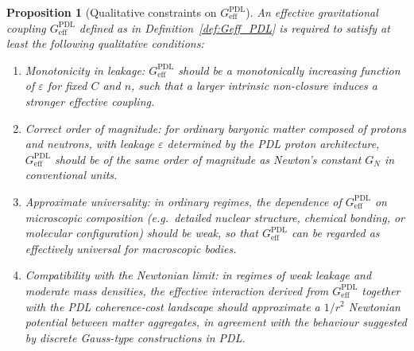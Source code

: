 \documentclass[11pt,a4paper]{article}
\newtheorem{proposition}[theorem]{Proposition}
\theoremstyle{definition}
\newcommand{\PDL}{\mathrm{PDL}}
\begin{document}
\begin{proposition}[Qualitative constraints on $G_{\mathrm{eff}}^{\PDL}$]
\label{prop:Geff_constraints}
An effective gravitational coupling $G_{\mathrm{eff}}^{\PDL}$ defined as in Definition~\ref{def:Geff_PDL} is required to satisfy at least the following qualitative conditions:
\begin{enumerate}
  \item[(i)] \emph{Monotonicity in leakage:} $G_{\mathrm{eff}}^{\PDL}$ should be a monotonically increasing function of $\varepsilon$ for fixed $C$ and $n$, such that a larger intrinsic non-closure induces a stronger effective coupling.\cite{Exponent_18_PDL_2026,Topological_Reformulation_PDL_2026}
  \item[(ii)] \emph{Correct order of magnitude:} for ordinary baryonic matter composed of protons and neutrons, with leakage $\varepsilon$ determined by the PDL proton architecture, $G_{\mathrm{eff}}^{\PDL}$ should be of the same order of magnitude as Newton’s constant $G_N$ in conventional units.\cite{Exponent_18_PDL_2026,Effective_Fields_PDL_2026}
  \item[(iii)] \emph{Approximate universality:} in ordinary regimes, the dependence of $G_{\mathrm{eff}}^{\PDL}$ on microscopic composition (e.g.\ detailed nuclear structure, chemical bonding, or molecular configuration) should be weak, so that $G_{\mathrm{eff}}^{\PDL}$ can be regarded as effectively universal for macroscopic bodies.\cite{Effective_Fields_PDL_2026,PDL_Global_Mapping_2026}
  \item[(iv)] \emph{Compatibility with the Newtonian limit:} in regimes of weak leakage and moderate mass densities, the effective interaction derived from $G_{\mathrm{eff}}^{\PDL}$ together with the PDL coherence-cost landscape should approximate a $1/r^2$ Newtonian potential between matter aggregates, in agreement with the behaviour suggested by discrete Gauss-type constructions in PDL.\cite{Effective_Fields_PDL_2026}
\end{enumerate}
\end{proposition}
\end{document}

